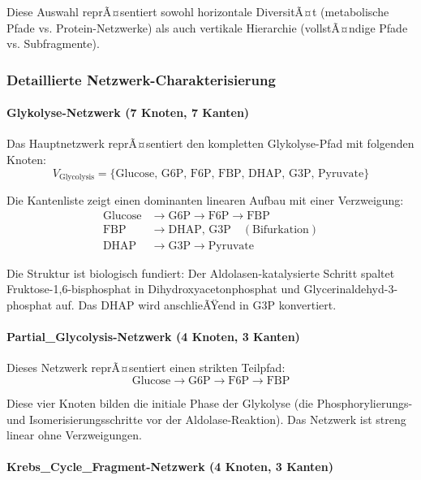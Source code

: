 ﻿\documentclass[a4paper,12pt]{article}
\theoremstyle{definition}
\begin{document}
Diese Auswahl reprÃ¤sentiert sowohl horizontale DiversitÃ¤t (metabolische Pfade vs. Protein-Netzwerke) als auch vertikale Hierarchie (vollstÃ¤ndige Pfade vs. Subfragmente).

\subsubsection{Detaillierte Netzwerk-Charakterisierung}

\paragraph{Glykolyse-Netzwerk (7 Knoten, 7 Kanten)}

Das Hauptnetzwerk reprÃ¤sentiert den kompletten Glykolyse-Pfad mit folgenden Knoten:
\[
V_{\text{Glycolysis}} = \{\text{Glucose, G6P, F6P, FBP, DHAP, G3P, Pyruvate}\}
\]

Die Kantenliste zeigt einen dominanten linearen Aufbau mit einer Verzweigung:
\begin{align*}
	\text{Glucose} &\rightarrow \text{G6P} \rightarrow \text{F6P} \rightarrow \text{FBP} \\
	\text{FBP} &\rightarrow \text{DHAP, G3P} \quad (\text{Bifurkation}) \\
	\text{DHAP} &\rightarrow \text{G3P} \rightarrow \text{Pyruvate}
\end{align*}

Die Struktur ist biologisch fundiert: Der Aldolasen-katalysierte Schritt spaltet Fruktose-1,6-bisphosphat in Dihydroxyacetonphosphat und Glycerinaldehyd-3-phosphat auf. Das DHAP wird anschlieÃŸend in G3P konvertiert.

\paragraph{Partial\_Glycolysis-Netzwerk (4 Knoten, 3 Kanten)}

Dieses Netzwerk reprÃ¤sentiert einen strikten Teilpfad:
\[
\text{Glucose} \rightarrow \text{G6P} \rightarrow \text{F6P} \rightarrow \text{FBP}
\]

Diese vier Knoten bilden die initiale Phase der Glykolyse (die Phosphorylierungs- und Isomerisierungsschritte vor der Aldolase-Reaktion). Das Netzwerk ist streng linear ohne Verzweigungen.

\paragraph{Krebs\_Cycle\_Fragment-Netzwerk (4 Knoten, 3 Kanten)}
\end{document}
